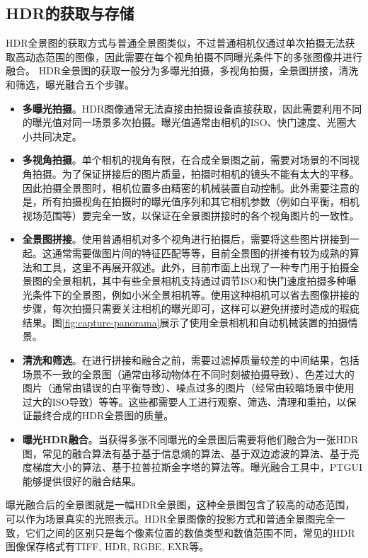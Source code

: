 \subsection{HDR的获取与存储}
HDR全景图的获取方式与普通全景图类似，不过普通相机仅通过单次拍摄无法获取高动态范围的图像，因此需要在每个视角拍摄不同曝光条件下的多张图像并进行融合。
HDR全景图的获取一般分为多曝光拍摄，多视角拍摄，全景图拼接，清洗和筛选，曝光融合五个步骤。
\begin{itemize}
    \item \textbf{多曝光拍摄}。HDR图像通常无法直接由拍摄设备直接获取，因此需要利用不同的曝光值对同一场景多次拍摄。曝光值通常由相机的ISO、快门速度、光圈大小共同决定。
    \item \textbf{多视角拍摄}。单个相机的视角有限，在合成全景图之前，需要对场景的不同视角拍摄。为了保证拼接后的图片质量，拍摄时相机的镜头不能有太大的平移。因此拍摄全景图时，相机位置多由精密的机械装置自动控制。此外需要注意的是，所有拍摄视角在拍摄时的曝光值序列和其它相机参数（例如白平衡，相机视场范围等）要完全一致，以保证在全景图拼接时的各个视角图片的一致性。
    \item \textbf{全景图拼接}。使用普通相机对多个视角进行拍摄后，需要将这些图片拼接到一起。这通常需要做图片间的特征匹配等等，目前全景图的拼接有较为成熟的算法和工具，这里不再展开叙述。此外，目前市面上出现了一种专门用于拍摄全景图的全景相机，其中有些全景相机支持通过调节ISO和快门速度拍摄多种曝光条件下的全景图，例如小米全景相机\cite{xiaomi}等。使用这种相机可以省去图像拼接的步骤，每次拍摄只需要关注相机的曝光即可，这样可以避免拼接时造成的瑕疵结果。图\ref{fig:capture-panorama}展示了使用全景相机和自动机械装置的拍摄情景。
    \item \textbf{清洗和筛选}。在进行拼接和融合之前，需要过滤掉质量较差的中间结果，包括场景不一致的全景图（通常由移动物体在不同时刻被拍摄导致）、色差过大的图片（通常由错误的白平衡导致）、噪点过多的图片（经常由较暗场景中使用过大的ISO导致）等等。这些都需要人工进行观察、筛选、清理和重拍，以保证最终合成的HDR全景图的质量。
    \item \textbf{曝光HDR融合}。当获得多张不同曝光的全景图后需要将他们融合为一张HDR图，常见的融合算法有基于基于信息熵的算法、基于双边滤波的算法、基于亮度梯度大小的算法、基于拉普拉斯金字塔的算法等。曝光融合工具中，PTGUI\cite{ptgui}能够提供很好的融合结果。
\end{itemize}



曝光融合后的全景图就是一幅HDR全景图，这种全景图包含了较高的动态范围，可以作为场景真实的光照表示。HDR全景图像的投影方式和普通全景图完全一致，它们之间的区别只是每个像素位置的数值类型和数值范围不同，常见的HDR图像保存格式有TIFF, HDR, RGBE, EXR等。

